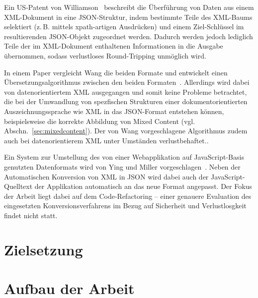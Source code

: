 Ein US-Patent von Williamson~\cite{US20140244692} beschreibt die Überführung von Daten aus einem XML-Dokument in eine JSON-Struktur, indem bestimmte Teile des XML-Baums selektiert (z.\,B. mittels \acrshort{xpath}-artigen Ausdrücken) und einem Ziel-Schlüssel im resultierenden JSON-Objekt zugeordnet werden. Dadurch werden jedoch lediglich Teile der im XML-Dokument enthaltenen Informationen in die Ausgabe übernommen, sodass verlustloses Round-Tripping unmöglich wird.

In einem Paper vergleicht Wang die beiden Formate und entwickelt einen Übersetzungsalgorithmus zwischen den beiden Formaten~\cite{wang2011improving}. Allerdings wird dabei von datenorientiertem XML ausgegangen und somit keine Probleme betrachtet, die bei der Umwandlung von spezfischen Strukturen einer dokumentorientierten Auszeichnungssprache wie XML in das JSON-Format entstehen können, beispielsweise die korrekte Abbildung von Mixed Content (vgl. Abschn.~\ref{sec:mixedcontent}). Der von Wang vorgeschlagene Algorithmus zudem auch bei datenorientierem XML unter Umständen verlustbehaftet.\cite[S.~184]{wang2011improving}.

Ein System zur Umstellung des von einer Webapplikation auf JavaScript-Basis genutzten Datenformats wird von Ying und Miller vorgeschlagen~\cite{ying2013refactoring}. Neben der Automatischen Konversion von XML in JSON wird dabei auch der JavaScript-Quelltext der Applikation automatisch an das neue Format angepasst. Der Fokus der Arbeit liegt dabei auf dem Code-Refactoring -- einer genauere Evaluation des eingesetzten Konversionsverfahrens im Bezug auf Sicherheit und Verlustlosgkeit findet nicht statt.



\section{Zielsetzung}

\section{Aufbau der Arbeit}
\label{sec:structure}

